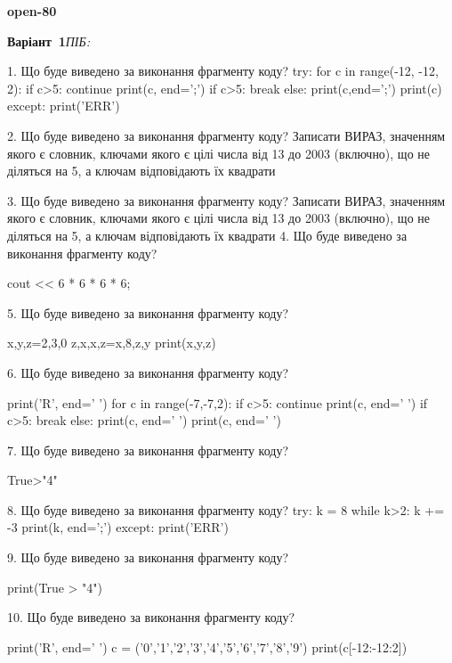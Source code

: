 \documentclass[11pt]{article}
\begin{document}
{\large\textbf{open-80}}

\textbf{Варіант \No\,1}\hfill \textit{ПІБ:}\,\underline{\hspace{60mm}}
\vspace{4mm}

1. Що буде виведено за виконання фрагменту коду?
try:
    for c in range(-12, -12, 2):
        if c>5:
            continue
        print(c, end=';')
        if c>5:
            break
    else:
        print(c,end=';')
    print(c)
except:
    print('ERR')

2. Що буде виведено за виконання фрагменту коду?
Записати ВИРАЗ, значенням якого є словник, ключами якого є цілі числа від 13 до 2003 (включно), що не діляться на 5, а ключам відповідають їх квадрати 

3. Що буде виведено за виконання фрагменту коду?
Записати ВИРАЗ, значенням якого є словник, ключами якого є цілі числа від 13 до 2003 (включно), що не діляться на 5, а ключам відповідають їх квадрати 
4. Що буде виведено за виконання фрагменту коду?

cout << 6 * 6 * 6 * 6;

5. Що буде виведено за виконання фрагменту коду?

x,y,z=2,3,0
z,x,x,z=x,8,z,y
print(x,y,z)

6. Що буде виведено за виконання фрагменту коду?

print('R', end=' ')
for c in range(-7,-7,2):
    if c>5:
        continue
        print(c, end=' ')
    if c>5:
        break
    else:
        print(c, end=' ')
    print(c, end=' ')

7. Що буде виведено за виконання фрагменту коду?

True>"4"

8. Що буде виведено за виконання фрагменту коду?
try:
    k = 8
    while k>2:
        k += -3
    print(k, end=';')
except:
    print('ERR')

9. Що буде виведено за виконання фрагменту коду?

print(True > "4")

10. Що буде виведено за виконання фрагменту коду?

print('R', end=' ')
c = ('0','1','2','3','4','5','6','7','8','9')
print(c[-12:-12:2])
\end{document}
